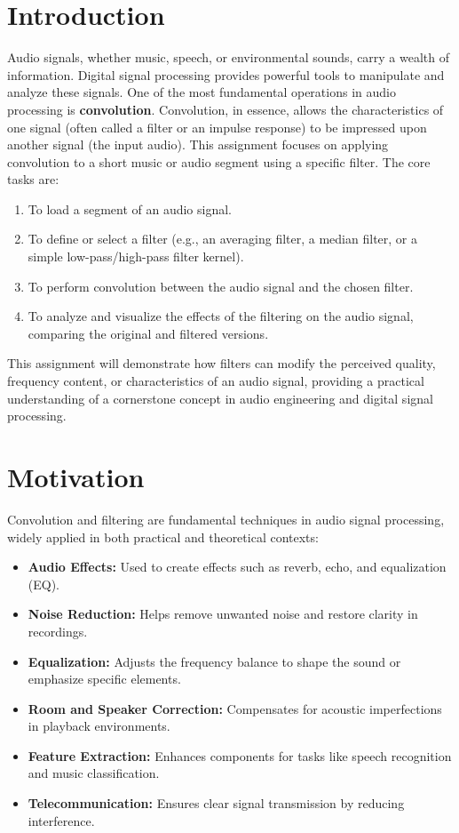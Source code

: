 \documentclass[12pt, a4paper]{article}
\begin{document}
\section{Introduction}
\label{sec:introduction}
Audio signals, whether music, speech, or environmental sounds, carry a wealth of information. Digital signal processing provides powerful tools to manipulate and analyze these signals. One of the most fundamental operations in audio processing is \textbf{convolution}. Convolution, in essence, allows the characteristics of one signal (often called a filter or an impulse response) to be impressed upon another signal (the input audio).
This assignment focuses on applying convolution to a short music or audio segment using a specific filter. The core tasks are:
\begin{enumerate}
    \item To load a segment of an audio signal.
    \item To define or select a filter (e.g., an averaging filter, a median filter, or a simple low-pass/high-pass filter kernel).
    \item To perform convolution between the audio signal and the chosen filter.
    \item To analyze and visualize the effects of the filtering on the audio signal, comparing the original and filtered versions.
\end{enumerate}
This assignment will demonstrate how filters can modify the perceived quality, frequency content, or characteristics of an audio signal, providing a practical understanding of a cornerstone concept in audio engineering and digital signal processing.

\section{Motivation}
\label{sec:motivation}

Convolution and filtering are fundamental techniques in audio signal processing, widely applied in both practical and theoretical contexts:

\begin{itemize}
    \item \textbf{Audio Effects:} Used to create effects such as reverb, echo, and equalization (EQ).
    \item \textbf{Noise Reduction:} Helps remove unwanted noise and restore clarity in recordings.
    \item \textbf{Equalization:} Adjusts the frequency balance to shape the sound or emphasize specific elements.
    \item \textbf{Room and Speaker Correction:} Compensates for acoustic imperfections in playback environments.
    \item \textbf{Feature Extraction:} Enhances components for tasks like speech recognition and music classification.
    \item \textbf{Telecommunication:} Ensures clear signal transmission by reducing interference.
\end{itemize}
\end{document}
